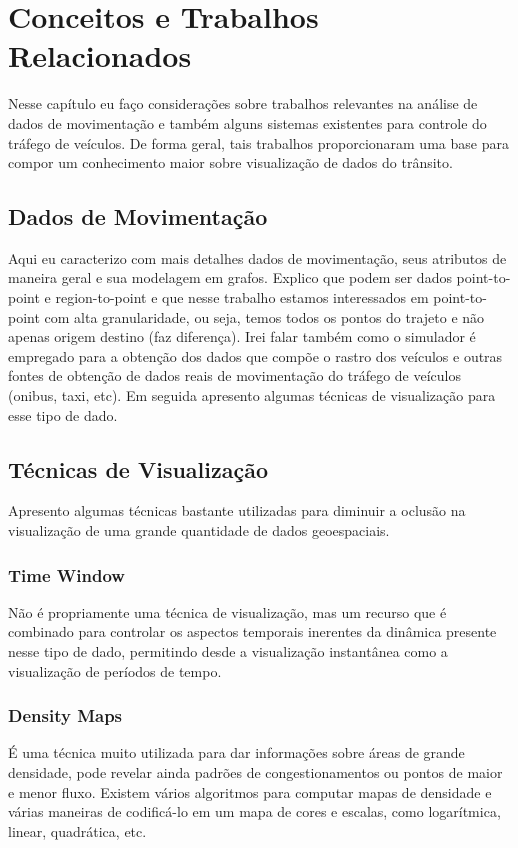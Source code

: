 \chapter{Conceitos e Trabalhos Relacionados}
\label{cap:trabalhos-relacionados}

Nesse capítulo eu faço considerações sobre trabalhos relevantes na
análise de dados de movimentação e também alguns sistemas existentes para
controle do tráfego de veículos. De forma geral, tais trabalhos proporcionaram
uma base para compor um conhecimento maior sobre visualização de dados do
trânsito.

\section{Dados de Movimentação}

Aqui eu caracterizo com mais detalhes dados de movimentação, seus atributos
de maneira geral e sua modelagem em grafos. Explico que podem ser dados point-to-point
e region-to-point e que nesse trabalho estamos interessados em point-to-point com alta granularidade,
ou seja, temos todos os pontos do trajeto e não apenas origem destino (faz diferença).
Irei falar também como o simulador é empregado para a obtenção
dos dados que compõe o rastro dos veículos e outras fontes de obtenção de dados
reais de movimentação do tráfego de veículos (onibus, taxi, etc). Em seguida apresento
algumas técnicas de visualização para esse tipo de dado.

\section{Técnicas de Visualização}
  Apresento algumas técnicas bastante utilizadas para diminuir a oclusão na visualização
  de uma grande quantidade de dados geoespaciais.
  \subsection{Time Window}
    Não é propriamente uma técnica de visualização, mas um recurso que é combinado
    para controlar os aspectos temporais inerentes da dinâmica presente nesse tipo
    de dado, permitindo desde a visualização instantânea como a visualização
    de períodos de tempo.
  \subsection{Density Maps}
    É uma técnica muito utilizada para dar informações sobre áreas de grande
    densidade, pode revelar ainda padrões de congestionamentos ou pontos de maior
    e menor fluxo. Existem vários algoritmos para computar mapas de densidade e
    várias maneiras de codificá-lo em um mapa de cores e escalas, como logarítmica,
    linear, quadrática, etc.
